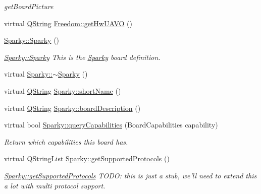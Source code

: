 \begin{DoxyCompactItemize}
\begin{DoxyCompactList}\small\item\em get\-Board\-Picture \end{DoxyCompactList}\item 
virtual \hyperlink{group___u_a_v_objects_plugin_gab9d252f49c333c94a72f97ce3105a32d}{Q\-String} \hyperlink{group___boards___tau_labs_plugin_ga09397e9d9712878ddda4020b236f9ed5}{Freedom\-::get\-Hw\-U\-A\-V\-O} ()
\item 
\hyperlink{group___boards___tau_labs_plugin_ga81d45abeade9a73a7d354c71e826e906}{Sparky\-::\-Sparky} ()
\begin{DoxyCompactList}\small\item\em \hyperlink{group___boards___tau_labs_plugin_ga81d45abeade9a73a7d354c71e826e906}{Sparky\-::\-Sparky} This is the \hyperlink{class_sparky}{Sparky} board definition. \end{DoxyCompactList}\item 
virtual \hyperlink{group___boards___tau_labs_plugin_gafad187a9e7207b7b14ca0c71eaa7ad48}{Sparky\-::$\sim$\-Sparky} ()
\item 
virtual \hyperlink{group___u_a_v_objects_plugin_gab9d252f49c333c94a72f97ce3105a32d}{Q\-String} \hyperlink{group___boards___tau_labs_plugin_gac9c737083d657f5a125688683f1adf88}{Sparky\-::short\-Name} ()
\item 
virtual \hyperlink{group___u_a_v_objects_plugin_gab9d252f49c333c94a72f97ce3105a32d}{Q\-String} \hyperlink{group___boards___tau_labs_plugin_gad8873cb94f7f63588e8e88b20d511d76}{Sparky\-::board\-Description} ()
\item 
virtual bool \hyperlink{group___boards___tau_labs_plugin_ga4b25de756ae522bc8ec649c4885a4e91}{Sparky\-::query\-Capabilities} (Board\-Capabilities capability)
\begin{DoxyCompactList}\small\item\em Return which capabilities this board has. \end{DoxyCompactList}\item 
virtual Q\-String\-List \hyperlink{group___boards___tau_labs_plugin_gae2df29177bbd9a5f916f60eeb6be284c}{Sparky\-::get\-Supported\-Protocols} ()
\begin{DoxyCompactList}\small\item\em \hyperlink{group___boards___tau_labs_plugin_gae2df29177bbd9a5f916f60eeb6be284c}{Sparky\-::get\-Supported\-Protocols} T\-O\-D\-O\-: this is just a stub, we'll need to extend this a lot with multi protocol support. \end{DoxyCompactList}\item 

\end{DoxyCompactItemize}
